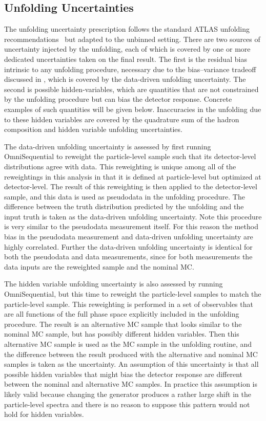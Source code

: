 \subsection{Unfolding Uncertainties}
\label{sec:zjets-uncert-unfold}

The unfolding uncertainty prescription follows the standard ATLAS unfolding recommendations~\cite{Armbruster:1694351} but adapted to the unbinned setting.
There are two sources of uncertainty injected by the unfolding, each of which is covered by one or more dedicated uncertainties taken on the final result.
The first is the residual bias intrinsic to any unfolding procedure, necessary due to the bias--variance tradeoff discussed in , which is covered by the data-driven unfolding uncertainty.
The second is possible hidden-variables, which are quantities that are not constrained by the unfolding procedure but can bias the detector response.
Concrete examples of such quantities will be given below.
Inaccuracies in the unfolding due to these hidden variables are covered by the quadrature sum of the hadron composition and hidden variable unfolding uncertainties.

The data-driven unfolding uncertainty is assessed by first running OmniSequential to reweight the particle-level \mgpy sample such that its detector-level distributions agree with data.
This reweighting is unique among all of the reweightings in this analysis in that it is defined at particle-level but optimized at detector-level.
The result of this reweighting is then applied to the detector-level \mgpy sample, and this data is used as pseudodata in the unfolding procedure.
The difference between the truth distribution predicted by the unfolding and the input truth is taken as the data-driven unfolding uncertainty.
Note this procedure is very similar to the pseudodata measurement itself.
For this reason the method bias in the pseudodata measurement and data-driven unfolding uncertainty are highly correlated.
Further the data-driven unfolding uncertainty is identical for both the pseudodata and data measurements, since for both measurements the data inputs are the reweighted \mgpy sample and the nominal MC.

The hidden variable unfolding uncertainty is also assessed by running OmniSequential, but this time to reweight the particle-level \sherpa samples to match the particle-level \mgpy sample.
This reweighting is performed in a set of observables that are all functions of the full phase space explicitly included in the \Omnifold unfolding procedure.
The result is an alternative MC sample that looks similar to the nominal MC sample, but has possibly different hidden variables.
Then this alternative MC sample is used as the MC sample in the unfolding routine, and the difference between the result produced with the alternative and nominal MC samples is taken as the uncertainty.
An assumption of this uncertainty is that all possible hidden variables that might bias the detector response are different between the nominal and alternative MC samples.
In practice this assumption is likely valid because changing the generator produces a rather large shift in the particle-level spectra and there is no reason to suppose this pattern would not hold for hidden variables.

